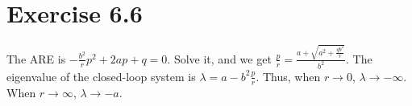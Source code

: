 \documentclass[11pt]{report}
\begin{document}
\section*{Exercise 6.6}
The ARE is $-\frac{b^2}{r}p^2 + 2ap + q = 0$. Solve it, and we get $\frac{p}{r} = \frac{a + \sqrt{a^2+\frac{qb^2}{r}}}{b^2}$. The eigenvalue of the closed-loop system is $\lambda = a - b^2\frac{p}{r}$. Thus, when $r \to 0$, $\lambda \to -\infty$. When $r \to \infty$, $\lambda \to -a$.
\end{document}
